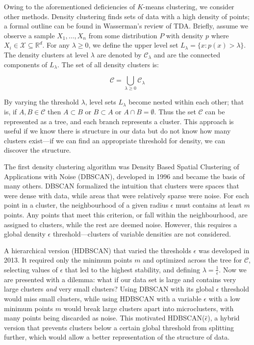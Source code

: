 Owing to the aforementioned deficiencies of $K$-means clustering, we consider other methods. Density clustering finds sets of data with a high density of points; a formal outline can be found in Wasserman's review of TDA\citep{wasserman_topological_2018}. Briefly, assume we observe a sample $X_{1}, \dots , X_{n}$ from some distribution $P$ with density $p$ where $X_{i} \in \mathcal{X} \subseteq \mathbb{R}^d$. For any $\lambda \ge 0$, we define the upper level set $L_{\lambda} = \{x: p(x) > \lambda \}$. The density clusters at level $\lambda$ are denoted by $\mathcal{C}_{\lambda}$ and are the connected components of $L_{\lambda}$. The set of all density clusters is:

$$ \mathcal{C} = \bigcup_{\lambda \ge 0} \mathcal{C}_{\lambda} $$

By varying the threshold $\lambda$, level sets $L_{\lambda}$ become nested within each other; that is, if $A, B \in \mathcal{C}$ then $A \subset B$ or $B \subset A$ or $A \cap B = \emptyset$. Thus the set $\mathcal{C}$ can be represented as a tree, and each branch represents a cluster. This approach is useful if we know there is structure in our data but do not know how many clusters exist---if we can find an appropriate threshold for density, we can discover the structure.

The first density clustering algorithm was Density Based Spatial Clustering of Applications with Noise (DBSCAN), developed in 1996\citep{ester1996density} and became the basis of many others\citep{khan_dbscan_2014}. DBSCAN formalized the intuition that clusters were spaces that were dense with data, while areas that were relatively sparse were noise. For each point in a cluster, the neighbourhood of a given radius $\epsilon$ must contains at least $m$ points. Any points that meet this criterion, or fall within the neighbourhood, are assigned to clusters, while the rest are deemed noise. However, this requires a global density $\epsilon$ threshold---clusters of variable densities are not considered. 

A hierarchical version (HDBSCAN) that varied the thresholds $\epsilon$ was developed in 2013\citep{campello_density-based_2013}. It required only the minimum points $m$ and optimized across the tree for $\mathcal{C}$, selecting values of $\epsilon$ that led to the highest stability, and defining $\lambda = \frac{1}{\epsilon}$. Now we are presented with a dilemma: what if our data set is large and contains very large clusters \emph{and} very small clusters? Using DBSCAN with its global $\epsilon$ threshold would miss small clusters, while using HDBSCAN with a variable $\epsilon$ with a low minimum points $m$ would break large clusters apart into microclusters, with many points being discarded as noise. This motivated HDBSCAN($\hat{\epsilon}$), a hybrid version that prevents clusters below a certain global threshold from splitting further, which would allow a better representation of the structure of data\citep{malzer_hybrid_2020}.


